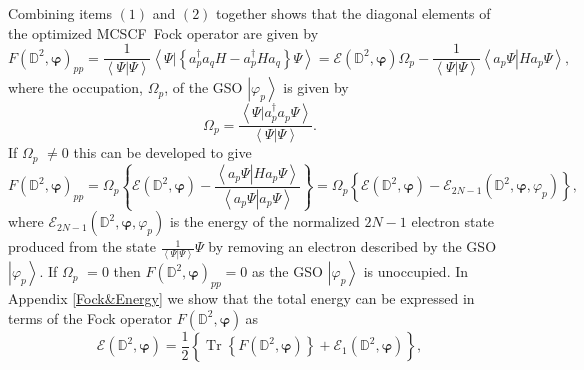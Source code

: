 \documentclass[aps,preprint]{revtex4}%
\begin{document}
Combining items $\left(  1\right)  $ and $\left(  2\right)  $ together shows
that the diagonal elements of the optimized MCSCF\ Fock operator are given by
\begin{equation}
F\left(  \mathbb{D}^{2},\bm{\varphi}\right)  _{pp}=\frac{1}{\left\langle
\left.  \Psi\right\vert \Psi\right\rangle }\left\langle \left.  \Psi
\right\vert \left\{  a_{p}^{\dagger}a_{q}H-a_{p}^{\dagger}Ha_{q}\right\}
\Psi\right\rangle =\mathcal{E}\left(  \mathbb{D}^{2},\bm{\varphi}\right)
\Omega_{p}-\frac{1}{\left\langle \left.  \Psi\right\vert \Psi\right\rangle
}\left\langle \left.  a_{p}\Psi\right\vert Ha_{p}\Psi\right\rangle ,
\end{equation}
where the occupation, $\Omega_{p}$, of the GSO $\left\vert \varphi
_{p}\right\rangle $ is given by
\begin{equation}
\Omega_{p}=\frac{\left\langle \left.  \Psi\right\vert a_{p}^{\dagger}a_{p}%
\Psi\right\rangle }{\left\langle \left.  \Psi\right\vert \Psi\right\rangle }.
\end{equation}
If $\Omega_{p}$ $\neq0$ this can be developed to give
\begin{equation}
F\left(  \mathbb{D}^{2},\bm{\varphi}\right)  _{pp}=\Omega_{p}\left\{
\mathcal{E}\left(  \mathbb{D}^{2},\bm{\varphi}\right)  -\frac{\left\langle
\left.  a_{p}\Psi\right\vert Ha_{p}\Psi\right\rangle }{\left\langle \left.
a_{p}\Psi\right\vert a_{p}\Psi\right\rangle }\right\}  =\Omega_{p}\left\{
\mathcal{E}\left(  \mathbb{D}^{2},\bm{\varphi}\right)  -\mathcal{E}%
_{2N-1}\left(  \mathbb{D}^{2},\bm{\varphi,}\varphi_{p}\right)  \right\}  ,
\end{equation}
where $\mathcal{E}_{2N-1}\left(  \mathbb{D}^{2},\bm{\varphi,}\varphi
_{p}\right)  $ is the energy of the normalized $2N-1$ electron state produced
from the state $\frac{1}{\left\langle \left.  \Psi\right\vert \Psi
\right\rangle }\Psi$ by removing an electron described by the GSO\ $\left\vert
\varphi_{p}\right\rangle $. If $\Omega_{p}$ $=0$ then $F\left(  \mathbb{D}%
^{2},\bm{\varphi}\right)  _{pp}=0$ as the GSO $\left\vert \varphi
_{p}\right\rangle $ is unoccupied. In Appendix \ref{Fock&Energy} we show that
the total energy can be expressed in terms of the Fock operator $F\left(
\mathbb{D}^{2},\bm{\varphi}\right)  \ $as
\begin{equation}
\mathcal{E}\left(  \mathbb{D}^{2},\bm{\varphi}\right)  =\frac{1}{2}\left\{
\overset{}{\operatorname{Tr}\left\{  F\left(  \mathbb{D}^{2}%
,\bm{\varphi}\right)  \right\}  +\mathcal{E}_{1}\left(  \mathbb{D}%
^{2},\bm{\varphi}\right)  }\right\}  ,
\end{equation}
\end{document}
